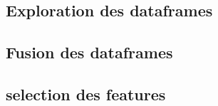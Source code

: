 

\subsection{Exploration des dataframes}


\subsection{Fusion des dataframes}


\subsection{selection  des features}
